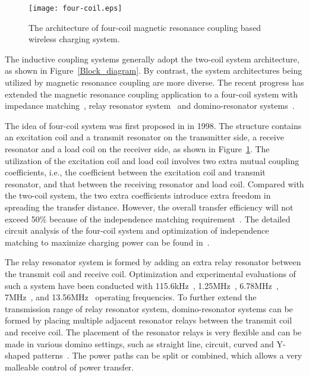 \documentclass[twocolumn,10pt]{IEEEtran}
\begin{document}
\begin{figure}
\centering
\texttt{[image: four-coil.eps]}
\caption{The architecture of four-coil magnetic resonance coupling based wireless charging system.} \label{four-coil}
\end{figure}

The inductive coupling systems generally adopt the two-coil system architecture, as shown in Figure~\ref{Block_diagram}. By contrast, the system architectures being utilized by magnetic resonance coupling are more diverse. The recent progress has extended the magnetic resonance coupling application to a four-coil system with impedance matching~\cite{J.2010Chen,P.2011Duong}, relay resonator system~\cite{X.2012Zhang,F.2011Zhang} and domino-resonator systems~\cite{X.2012Zhong,K.2012Lee,W.2013Zhong}.   

The idea of four-coil system was first proposed in \cite{T.1998Boys} in 1998. The structure contains an excitation coil and a transmit resonator on the transmitter side, a receive resonator and a load coil on the receiver side, as shown in Figure~\ref{four-coil}. The utilization of the excitation coil and load coil involves two extra mutual coupling coefficients, i.e., the coefficient between the excitation coil and transmit resonator, and that between the receiving resonator and load coil. Compared with the two-coil system, the two extra coefficients introduce extra freedom in spreading the transfer distance. However, the overall transfer efficiency will not exceed 50$\%$ because of the independence matching requirement~\cite{S.2011Cheon}. The detailed circuit analysis of the four-coil system and optimization of independence matching to maximize charging power can be found in~\cite{S.2011Cheon}.


The relay resonator system is formed by adding an extra relay resonator between the transmit coil and receive coil. Optimization and experimental evaluations of such a system have been conducted with 115.6kHz~\cite{X.2015Zhong}, 1.25MHz~\cite{W.2011Kim}, 6.78MHz~\cite{Y.2012Kim}, 7MHz~\cite{F.2011Zhang}, and 13.56MHz~\cite{M.2011Kiani} operating frequencies.  
To further extend the transmission range of relay resonator system, domino-resonator systems can be formed by placing multiple adjacent resonator relays between the transmit coil and receive coil. The placement of the resonator relays is very flexible and can be made in various domino settings, such as straight line, circuit, curved and Y-shaped  patterns~\cite{X.2012Zhong,K.2012Lee,W.2013Zhong}.
The power paths can be split or combined, which allows a very malleable control of power transfer.  
\end{document}

